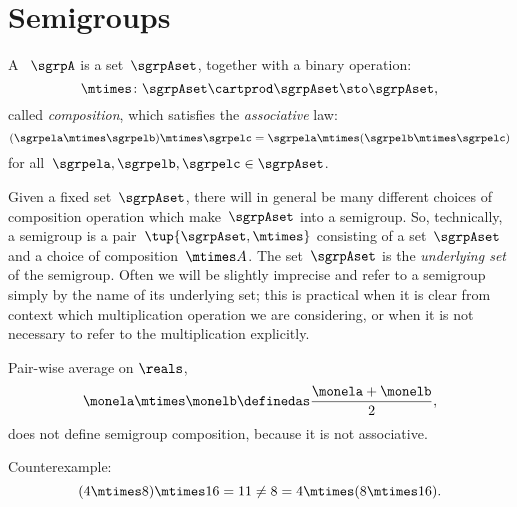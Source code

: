 

\section{Semigroups}
\label{sec:semigroups}

\begin{ctdefinition}[Semigroup]
  \label{def:semigroup}
  A \emph{}~$\sgrpA$ is a set~$\sgrpAset$, together with a binary operation:
  \begin{equation}
    \mtimes  \colon \sgrpAset \cartprod \sgrpAset \sto \sgrpAset,
  \end{equation}
  called \emph{composition}, which satisfies the \emph{associative} law:
  \begin{equation}
    \label{eq:semigroup-associative}
    (\sgrpela \mtimes   \sgrpelb)\mtimes   \sgrpelc
    = \sgrpela \mtimes   (\sgrpelb \mtimes  \sgrpelc)
  \end{equation}
  for all~$\sgrpela , \sgrpelb, \sgrpelc \in \sgrpAset$.
\end{ctdefinition}


\begin{remark}
  Given a fixed set~$\sgrpAset$, there will in general be many different choices of composition operation which make~$\sgrpAset$ into a semigroup.
  So, technically, a semigroup is a pair~$\tup{\sgrpAset, \mtimes}$ consisting of a set~$\sgrpAset$ and a choice of composition~$\mtimes A$.
  The set~$\sgrpAset$ is the \emph{underlying set} of the semigroup.
  Often we will be slightly imprecise and refer to a semigroup simply by the name of its underlying set;
  this is practical when it is clear from context which multiplication operation we are considering, or when it is not necessary to refer to the multiplication explicitly.
\end{remark}



\begin{example}
  Pair-wise average on $\reals$,
  \begin{equation}
    \label{eq:pairwise}
    \monela \mtimes \monelb \definedas  \frac{\monela + \monelb}{2},
  \end{equation}
  does not define semigroup composition, because it is not associative.

  Counterexample:
  \begin{equation}
    \label{eq:pairwise-counterexample}
    (4 \mtimes 8) \mtimes 16 = 11 \neq  8 = 4 \mtimes (8 \mtimes 16).
  \end{equation}
\end{example}



